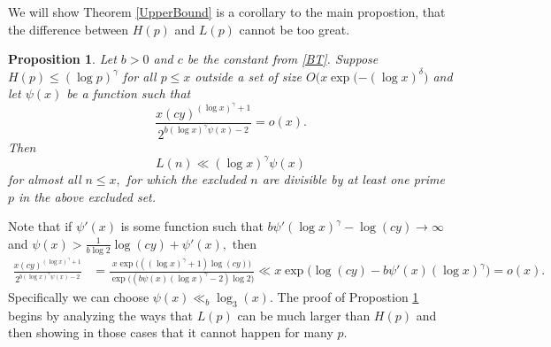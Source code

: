 \documentclass[12pt,regno]{amsart}
\newtheorem{proposition}[theorem]{Proposition}
\begin{document}
We will show Theorem \ref{UpperBound} is a corollary to the main propostion, that the difference between $H(p)$ and $L(p)$ cannot be too great.

\begin{proposition}\label{Prop}Let $b>0$ and $c$ be the constant from \eqref{BT}. Suppose $H(p) \le (\log p)^{\gamma}$ for all $p\le x$ outside a set of size $O\big(x\exp({-}(\log x)^\delta\big)$ and let $\psi(x)$ be a function such that
\begin{equation}
\frac{x(cy)^{(\log x)^\gamma+1}}{2^{b(\log x)^\gamma\psi(x)-2}}=o(x).
\end{equation} Then
$$L(n)\ll (\log x)^\gamma\psi(x)$$ for almost all $n \le x,$ for which the excluded $n$ are divisible by at least one prime $p$ in the above excluded set.
\end{proposition}
Note that if $\psi'(x)$ is some function such that $b\psi'(\log x)^{\gamma}-\log(cy)\rightarrow \infty$ and $\psi(x)>\frac{1}{b\log 2}\log(cy)+\psi'(x),$ then 
\begin{align*}\frac{x(cy)^{(\log x)^\gamma+1}}{2^{b(\log x)^\gamma\psi(x)-2}} & = \frac{x\exp\big(((\log x)^{\gamma}+1)\log(cy)\big)}{\exp\big((b\psi(x)(\log x)^\gamma-2)\log 2\big)}\ll x\exp\bigg(\log(cy)-b\psi'(x)(\log x)^{\gamma}  \bigg)=o(x).
\end{align*} Specifically we can choose $\psi(x)\ll_b \log_3(x).$ The proof of Propostion \ref{Prop} begins by analyzing the ways that $L(p)$ can be much larger than $H(p)$ and then showing in those cases that it cannot happen for many $p.$ 
\end{document}
